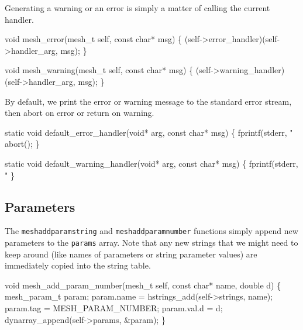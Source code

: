 \nwendcode{}\nwdocspar

Generating a warning or an error is simply a matter of calling the
current handler.

\nwenddocs{}\plusendmoddef
void mesh_error(mesh_t self, const char* msg)
\{
    (self->error_handler)(self->handler_arg, msg);
\}

void mesh_warning(mesh_t self, const char* msg)
\{
    (self->warning_handler)(self->handler_arg, msg);
\}

\nwendcode{}\nwdocspar

By default, we print the error or warning message to the standard
error stream, then abort on error or return on warning.

\nwenddocs{}\endmoddef
static void default_error_handler(void* arg, const char* msg)
\{
    fprintf(stderr, "%
    abort();
\}

static void default_warning_handler(void* arg, const char* msg)
\{
    fprintf(stderr, "%
\}

\nwendcode{}\nwdocspar


\subsection{Parameters}

The {\tt{}mesh{}add{}param{}string} and {\tt{}mesh{}add{}param{}number} functions simply
append new parameters to the {\tt{}params} array.  Note that any new strings
that we might need to keep around (like names of parameters or string
parameter values) are immediately copied into the string table.

\nwenddocs{}\plusendmoddef
void mesh_add_param_number(mesh_t self, const char* name, double d)
\{
    mesh_param_t param;
    param.name  = hstrings_add(self->strings, name);
    param.tag   = MESH_PARAM_NUMBER;
    param.val.d = d;
    dynarray_append(self->params, &param);
\}

